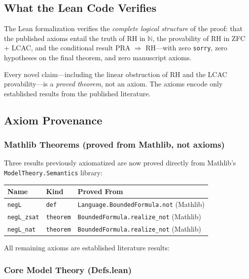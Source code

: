 \subsection*{What the Lean Code Verifies}

The Lean formalization verifies the \emph{complete logical structure} of the proof:
that the published axioms entail the truth of RH in $\mathbb{N}$, the provability
of RH in ZFC + LCAC, and the conditional result PRA $\Rightarrow$ RH---with
zero \texttt{sorry}, zero hypotheses on the final theorem, and zero manuscript
axioms.

Every novel claim---including the linear obstruction of RH and the
LCAC provability---is a \emph{proved theorem}, not an axiom. The axioms
encode only established results from the published literature.

\subsection*{Axiom Provenance}

\subsubsection*{Mathlib Theorems (proved from Mathlib, not axioms)}

Three results previously axiomatized are now proved directly from
Mathlib's \texttt{ModelTheory.Semantics} library:

\begin{center}
\begin{tabular}{llp{7cm}}
\toprule
\textbf{Name} & \textbf{Kind} & \textbf{Proved From} \\
\midrule
\texttt{negL} & \texttt{def} & \texttt{Language.BoundedFormula.not} (Mathlib) \\
\texttt{negL\_zsat} & \texttt{theorem} & \texttt{BoundedFormula.realize\_not} (Mathlib) \\
\texttt{negL\_nat} & \texttt{theorem} & \texttt{BoundedFormula.realize\_not} (Mathlib) \\
\bottomrule
\end{tabular}
\end{center}

All remaining axioms are established literature results:

\subsubsection*{Core Model Theory (Defs.lean)}

